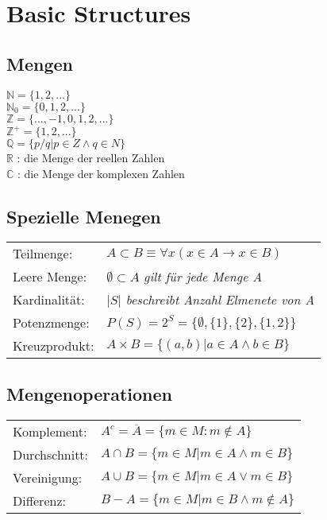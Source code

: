 \section{Basic Structures}

\subsection{Mengen}
$ \mathbb{N} = \{1, 2, ... \} $ \\
$ \mathbb{N}_0 = \{0, 1, 2, ... \} $ \\
$ \mathbb{Z} = \{ ... , -1, 0, 1, 2, ... \} $ \\
$ \mathbb{Z}^+ = \{1, 2, ... \} $ \\
$ \mathbb{Q} = \{ p / q | p \in Z \land q \in N \} $ \\
$ \mathbb{R} $ : die Menge der reellen Zahlen \\
$ \mathbb{C} $ : die Menge der komplexen Zahlen \\

\subsection{Spezielle Menegen}
\begin{tabular}{ll}
    Teilmenge: & $ A \subset B \equiv \forall x (x \in A \rightarrow x \in B) $ \\
    Leere Menge: & $ \emptyset \subset A $ \textit{gilt für jede Menge A} \\
    Kardinalität: & $ |S| $ \textit{beschreibt Anzahl Elmenete von A} \\
    Potenzmenge: & $ P(S) = 2^S = \{ \emptyset , \{1\} , \{2\} , \{1, 2\} \} $ \\
    Kreuzprodukt: & $A \times B = \{(a, b) |a \in A \land b \in B \} $ \\
\end{tabular} 

\subsection{Mengenoperationen}
\begin{tabular}{ll}
    Komplement: & $ A^c = \overline{A} = \{ m \in M : m \notin A \} $ \\
    Durchschnitt: & $ A \cap B = \{ m \in M | m \in A \land m \in B \} $ \\
    Vereinigung: & $ A \cup B = \{ m \in M | m \in A \lor m \in B \} $ \\
    Differenz: & $ B - A = \{ m \in M | m \in B \land m \notin A \} $
\end{tabular} 

